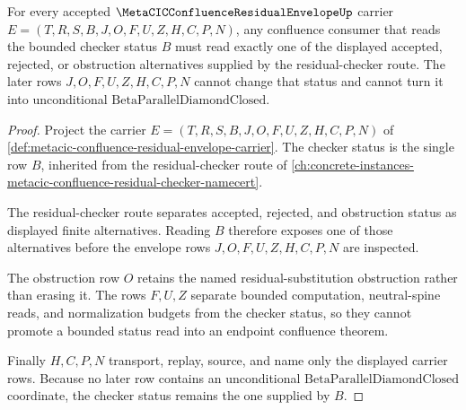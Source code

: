 \begin{theorem}
\label{thm:metacic-confluence-residual-envelope-checker-status-determinacy}
For every accepted $\MetaCICConfluenceResidualEnvelopeUp$ carrier $E=(T,R,S,B,J,O,F,U,Z,H,C,P,N)$, any confluence consumer that reads the bounded checker status $B$ must read exactly one of the displayed accepted, rejected, or obstruction alternatives supplied by the residual-checker route. The later rows $J,O,F,U,Z,H,C,P,N$ cannot change that status and cannot turn it into unconditional $\mathrm{BetaParallelDiamondClosed}$.
\end{theorem}
\begin{proof}
Project the carrier $E=(T,R,S,B,J,O,F,U,Z,H,C,P,N)$ of \autoref{def:metacic-confluence-residual-envelope-carrier}. The checker status is the single row $B$, inherited from the residual-checker route of \autoref{ch:concrete-instances-metacic-confluence-residual-checker-namecert}.

The residual-checker route separates accepted, rejected, and obstruction status as displayed finite alternatives. Reading $B$ therefore exposes one of those alternatives before the envelope rows $J,O,F,U,Z,H,C,P,N$ are inspected.

The obstruction row $O$ retains the named residual-substitution obstruction rather than erasing it. The rows $F,U,Z$ separate bounded computation, neutral-spine reads, and normalization budgets from the checker status, so they cannot promote a bounded status read into an endpoint confluence theorem.

Finally $H,C,P,N$ transport, replay, source, and name only the displayed carrier rows. Because no later row contains an unconditional $\mathrm{BetaParallelDiamondClosed}$ coordinate, the checker status remains the one supplied by $B$.
\end{proof}

